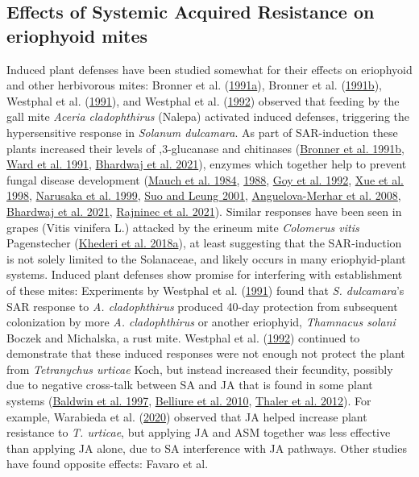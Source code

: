 \documentclass{ufdissertation}[overrideChapters] %
\begin{document}
{{\subsection{Effects of Systemic Acquired Resistance on eriophyoid mites}\label{effects-of-systemic-acquired-resistance-on-eriophyoid-mites}}

Induced plant defenses have been studied somewhat for their effects on eriophyoid and other herbivorous mites: Bronner et al. (\protect\hyperlink{ref-Bronner1991}{1991a}), Bronner et al. (\protect\hyperlink{ref-Bronner1991a}{1991b}), Westphal et al. (\protect\hyperlink{ref-Westphal1991}{1991}), and Westphal et al. (\protect\hyperlink{ref-Westphal1992}{1992}) observed that feeding by the gall mite \emph{Aceria cladophthirus} (Nalepa) activated induced defenses, triggering the hypersensitive response in \emph{Solanum dulcamara}. As part of SAR-induction these plants increased their levels of ,3-glucanase and chitinases (\protect\hyperlink{ref-Bronner1991a}{Bronner et al. 1991b}, \protect\hyperlink{ref-Ward1991a}{Ward et al. 1991}, \protect\hyperlink{ref-Bhardwaj2021}{Bhardwaj et al. 2021}), enzymes which together help to prevent fungal disease development (\protect\hyperlink{ref-Mauch1984}{Mauch et al. 1984}, \protect\hyperlink{ref-Mauch1988}{1988}, \protect\hyperlink{ref-Goy1992}{Goy et al. 1992}, \protect\hyperlink{ref-Xue1998}{Xue et al. 1998}, \protect\hyperlink{ref-Narusaka1999}{Narusaka et al. 1999}, \protect\hyperlink{ref-Suo2001}{Suo and Leung 2001}, \protect\hyperlink{ref-AnguelovaMerhar2008}{Anguelova-Merhar et al. 2008}, \protect\hyperlink{ref-Bhardwaj2021}{Bhardwaj et al. 2021}, \protect\hyperlink{ref-Rajninec2021}{Rajninec et al. 2021}). Similar responses have been seen in grapes (Vitis vinifera L.) attacked by the erineum mite \emph{Colomerus vitis} Pagenstecher (\protect\hyperlink{ref-Khederi2018b}{Khederi et al. 2018a}), at least suggesting that the SAR-induction is not solely limited to the Solanaceae, and likely occurs in many eriophyid-plant systems. Induced plant defenses show promise for interfering with establishment of these mites: Experiments by Westphal et al. (\protect\hyperlink{ref-Westphal1991}{1991}) found that \emph{S. dulcamara}'s SAR response to \emph{A. cladophthirus} produced 40-day protection from subsequent colonization by more \emph{A. cladophthirus} or another eriophyid, \emph{Thamnacus solani} Boczek and Michalska, a rust mite. Westphal et al. (\protect\hyperlink{ref-Westphal1992}{1992}) continued to demonstrate that these induced responses were not enough not protect the plant from \emph{Tetranychus urticae} Koch, but instead increased their fecundity, possibly due to negative cross-talk between SA and JA that is found in some plant systems (\protect\hyperlink{ref-Baldwin1997}{Baldwin et al. 1997}, \protect\hyperlink{ref-Belliure2010}{Belliure et al. 2010}, \protect\hyperlink{ref-Thaler2012}{Thaler et al. 2012}). For example, Warabieda et al. (\protect\hyperlink{ref-Warabieda2020}{2020}) observed that JA helped increase plant resistance to \emph{T. urticae}, but applying JA and ASM together was less effective than applying JA alone, due to SA interference with JA pathways. Other studies have found opposite effects: Favaro et al. }
\end{document}
